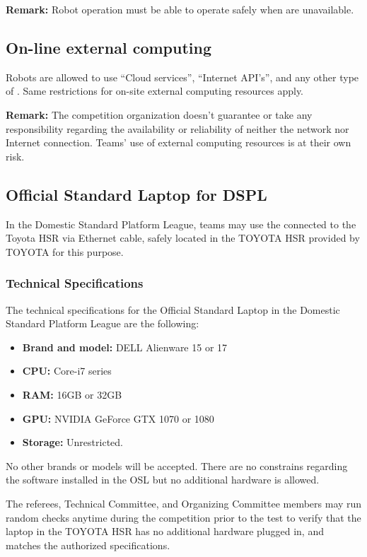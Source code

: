 \noindent \textbf{Remark:} Robot operation must be able to operate safely when  are unavailable.



\subsection{On-line external computing}
\label{rule:robot_external_computing_online}
Robots are allowed to use \enquote{Cloud services}, \enquote{Internet API's}, and any other type of .
Same restrictions for on-site external computing resources apply.

\noindent \textbf{Remark:} The competition organization doesn't guarantee or take any responsibility regarding the availability or reliability of neither the network nor Internet connection.
Teams' use of external computing resources is at their own risk.



\subsection{Official Standard Laptop for DSPL}
\label{rule:osl_dspl}

In the Domestic Standard Platform League, teams may use the  connected to the Toyota HSR via Ethernet cable, safely located in the TOYOTA HSR  provided by TOYOTA for this purpose.

\subsubsection{Technical Specifications}
The technical specifications for the Official Standard Laptop in the Domestic Standard Platform League are the following:


 \begin{itemize}
  \item \textbf{Brand and model:} DELL Alienware 15 or 17
  \item \textbf{CPU:} Core-i7 series
  \item \textbf{RAM:} 16GB or 32GB
  \item \textbf{GPU:} NVIDIA GeForce GTX 1070 or 1080
  \item \textbf{Storage:} Unrestricted.
\end{itemize}

No other brands or models will be accepted. There are no constrains regarding the software installed in the OSL but no additional hardware is allowed.

The referees, Technical Committee, and Organizing Committee members may run random checks anytime during the competition prior to the test to verify that the laptop in the TOYOTA HSR  has no additional hardware plugged in, and matches the authorized specifications.


